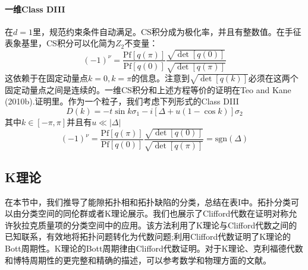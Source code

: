\documentclass{article}
\numberwithin{equation}{subsection}
\begin{document}
\paragraph{一维Class DIII}
在$d=1$里，规范约束条件自动满足。CS积分成为极化率，并且有整数值。在手征表象基里，CS积分可以化简为$Z_2$不变量：
\begin{equation}
    (-1)^\nu=\frac{\mathrm{Pf}[q(\pi)]}{\mathrm{Pf}[q(0)]}\frac{\sqrt{\det[q(0)]}}{\sqrt{\det[q(\pi)]}}
\end{equation}
这依赖于在固定动量点$k=0,k=\pi$的信息。注意到$\sqrt{\det[q(k)]}$必须在这两个固定动量点之间是连续的。一维CS积分和上述方程等价的证明在Teo and Kane (2010b).证明里。作为一个粒子，我们考虑下列形式的Class DIII
\begin{equation}
    D(k)=-t\sin k\sigma_1-i[\Delta+u(1-\cos k)]\sigma_2
\end{equation}
其中$k\in[-\pi,\pi]$并且有$u\ll |\Delta|$
\begin{equation}
    (-1)^\nu=\frac{\mathrm{Pf}[q(\pi)]}{\mathrm{Pf}[q(0)]}\frac{\sqrt{\det[q(0)]}}{\sqrt{\det[q(\pi)]}}=\mathrm{sgn}(\Delta)
\end{equation}
\subsection{K理论}
在本节中，我们推导了能隙拓扑相和拓扑缺陷的分类，总结在表I中。拓扑分类可以由分类空间的同伦群或者K理论展示。我们也展示了Clifford代数在证明对称允许狄拉克质量项的分类空间中的应用。该方法利用了K理论与Clifford代数之间的已知联系，有效地将拓扑问题转化为代数问题;利用Clifford代数证明了K理论的Bott周期性。K理论的Bott周期律由Clifford代数证明。对于K理论、克利福德代数和博特周期性的更完整和精确的描述，可以参考数学和物理方面的文献。
\end{document}
